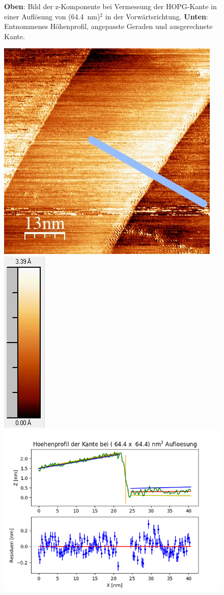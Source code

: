 \documentclass[12pt,a4paper]{article}
\begin{document}
\begin{figure}
\caption{\textbf{Oben}: Bild der z-Komponente bei Vermessung der HOPG-Kante in einer Auflösung von (\SI{64,4}{nm})$^2$ in der Vorwärtsrichtung. \textbf{Unten}: Entnommenes Höhenprofil, angepasste Geraden und ausgerechnete Kante.}
\end{figure}

\begin{figure}
\centering
\includegraphics[scale=0.6]{Bilder/Anhang/Kante/0644_Kante_nach.jpg}
\includegraphics[scale=0.6]{Bilder/Anhang/Kante/0644_Kante_nach_Skala.jpg}
\includegraphics[scale=0.6]{Bilder/Anhang/Kante/Profil_Kante_0644_rueck.png}

\end{figure}
\end{document}
